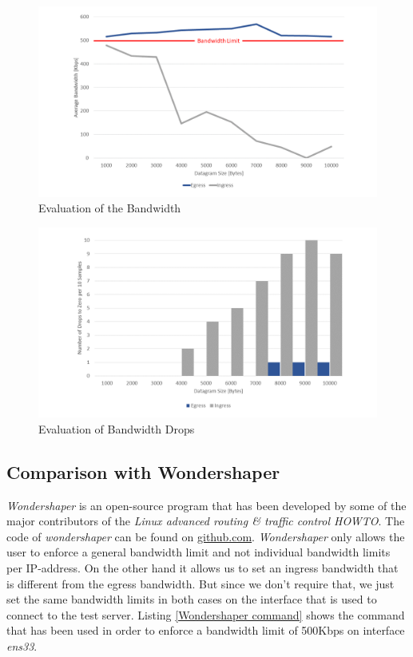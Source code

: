 \begin{figure}[h]
	\centering
	\includegraphics[width=\textwidth]{img/Evaluation-Bandwidth.png}
	\caption{Evaluation of the Bandwidth}
	\label{Evaluation of the Bandwidth}
\end{figure}

\begin{figure}[h]
	\centering
	\includegraphics[width=\textwidth]{img/Evaluation-Zeros.png}
	\caption{Evaluation of Bandwidth Drops}
	\label{Evaluation of the Bandwidth Drops}
\end{figure}

\newpage
\textit{ }
\newpage

\subsection{Comparison with Wondershaper}

\textit{Wondershaper} is an open-source program that has been developed by some of the major contributors of the \textit{Linux advanced routing \& traffic control HOWTO}\cite
{hubert2002linux}. The code of \textit{wondershaper} can be found on \href{https://github.com/magnific0/wondershaper}{github.com}\cite{hubert2002wondershaper}. \textit{Wondershaper} only allows the user to enforce a general bandwidth limit and not individual bandwidth limits per \acs{IP}-address. On the other hand it allows us to set an ingress bandwidth that is different from the egress bandwidth. But since we don't require that, we just set the same bandwidth limits in both cases on the interface that is used to connect to the test server. Listing \ref{Wondershaper command} shows the command that has been used in order to enforce a bandwidth limit of 500Kbps on interface \textit{ens33}.

